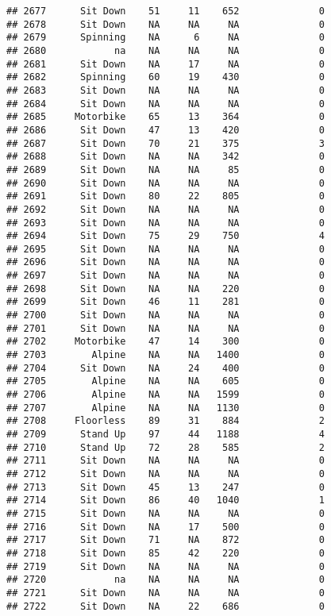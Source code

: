 \documentclass[
]{article}
\begin{document}
\begin{verbatim}
## 2677      Sit Down    51     11    652              0
## 2678      Sit Down    NA     NA     NA              0
## 2679      Spinning    NA      6     NA              0
## 2680            na    NA     NA     NA              0
## 2681      Sit Down    NA     17     NA              0
## 2682      Spinning    60     19    430              0
## 2683      Sit Down    NA     NA     NA              0
## 2684      Sit Down    NA     NA     NA              0
## 2685     Motorbike    65     13    364              0
## 2686      Sit Down    47     13    420              0
## 2687      Sit Down    70     21    375              3
## 2688      Sit Down    NA     NA    342              0
## 2689      Sit Down    NA     NA     85              0
## 2690      Sit Down    NA     NA     NA              0
## 2691      Sit Down    80     22    805              0
## 2692      Sit Down    NA     NA     NA              0
## 2693      Sit Down    NA     NA     NA              0
## 2694      Sit Down    75     29    750              4
## 2695      Sit Down    NA     NA     NA              0
## 2696      Sit Down    NA     NA     NA              0
## 2697      Sit Down    NA     NA     NA              0
## 2698      Sit Down    NA     NA    220              0
## 2699      Sit Down    46     11    281              0
## 2700      Sit Down    NA     NA     NA              0
## 2701      Sit Down    NA     NA     NA              0
## 2702     Motorbike    47     14    300              0
## 2703        Alpine    NA     NA   1400              0
## 2704      Sit Down    NA     24    400              0
## 2705        Alpine    NA     NA    605              0
## 2706        Alpine    NA     NA   1599              0
## 2707        Alpine    NA     NA   1130              0
## 2708     Floorless    89     31    884              2
## 2709      Stand Up    97     44   1188              4
## 2710      Stand Up    72     28    585              2
## 2711      Sit Down    NA     NA     NA              0
## 2712      Sit Down    NA     NA     NA              0
## 2713      Sit Down    45     13    247              0
## 2714      Sit Down    86     40   1040              1
## 2715      Sit Down    NA     NA     NA              0
## 2716      Sit Down    NA     17    500              0
## 2717      Sit Down    71     NA    872              0
## 2718      Sit Down    85     42    220              0
## 2719      Sit Down    NA     NA     NA              0
## 2720            na    NA     NA     NA              0
## 2721      Sit Down    NA     NA     NA              0
## 2722      Sit Down    NA     22    686              0

\end{verbatim}
\end{document}
